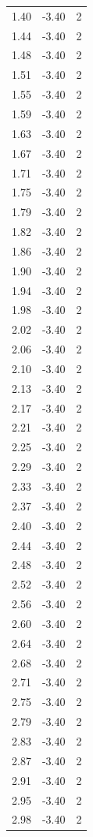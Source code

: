 \begin{longtable}{lrr}
  1.40 & -3.40 & 2 \\
  1.44 & -3.40 & 2 \\
  1.48 & -3.40 & 2 \\
  1.51 & -3.40 & 2 \\
  1.55 & -3.40 & 2 \\
  1.59 & -3.40 & 2 \\
  1.63 & -3.40 & 2 \\
  1.67 & -3.40 & 2 \\
  1.71 & -3.40 & 2 \\
  1.75 & -3.40 & 2 \\
  1.79 & -3.40 & 2 \\
  1.82 & -3.40 & 2 \\
  1.86 & -3.40 & 2 \\
  1.90 & -3.40 & 2 \\
  1.94 & -3.40 & 2 \\
  1.98 & -3.40 & 2 \\
  2.02 & -3.40 & 2 \\
  2.06 & -3.40 & 2 \\
  2.10 & -3.40 & 2 \\
  2.13 & -3.40 & 2 \\
  2.17 & -3.40 & 2 \\
  2.21 & -3.40 & 2 \\
  2.25 & -3.40 & 2 \\
  2.29 & -3.40 & 2 \\
  2.33 & -3.40 & 2 \\
  2.37 & -3.40 & 2 \\
  2.40 & -3.40 & 2 \\
  2.44 & -3.40 & 2 \\
  2.48 & -3.40 & 2 \\
  2.52 & -3.40 & 2 \\
  2.56 & -3.40 & 2 \\
  2.60 & -3.40 & 2 \\
  2.64 & -3.40 & 2 \\
  2.68 & -3.40 & 2 \\
  2.71 & -3.40 & 2 \\
  2.75 & -3.40 & 2 \\
  2.79 & -3.40 & 2 \\
  2.83 & -3.40 & 2 \\
  2.87 & -3.40 & 2 \\
  2.91 & -3.40 & 2 \\
  2.95 & -3.40 & 2 \\
  2.98 & -3.40 & 2 \\

\end{longtable}
